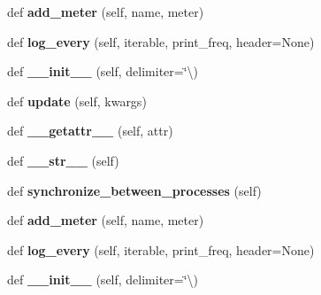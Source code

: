 \begin{DoxyCompactItemize}
\mbox{\label{classutils_1_1MetricLogger_a7ca17a885a17883f5301ee3bbe1682f6}} 
def {\bfseries add\+\_\+meter} (self, name, meter)
\item 
\mbox{\label{classutils_1_1MetricLogger_a52307f8e0e7d7036cec2034cb19dcbea}} 
def {\bfseries log\+\_\+every} (self, iterable, print\+\_\+freq, header=None)
\item 
\mbox{\label{classutils_1_1MetricLogger_a59c07b109de104bdab791643a7b3619b}} 
def {\bfseries \+\_\+\+\_\+init\+\_\+\+\_\+} (self, delimiter=\char`\"{}\textbackslash{})
\item 
\mbox{\label{classutils_1_1MetricLogger_a7ff577d15013ac9ad358428fd7e6ac77}} 
def {\bfseries update} (self, kwargs)
\item 
\mbox{\label{classutils_1_1MetricLogger_ac83dc82a4b7c2f4078fdbbc7d75ed18b}} 
def {\bfseries \+\_\+\+\_\+getattr\+\_\+\+\_\+} (self, attr)
\item 
\mbox{\label{classutils_1_1MetricLogger_a7dbbefdb1b1e47db288d2c3384af11fe}} 
def {\bfseries \+\_\+\+\_\+str\+\_\+\+\_\+} (self)
\item 
\mbox{\label{classutils_1_1MetricLogger_aceb85ddf415836087996c28d6ed54456}} 
def {\bfseries synchronize\+\_\+between\+\_\+processes} (self)
\item 
\mbox{\label{classutils_1_1MetricLogger_a7ca17a885a17883f5301ee3bbe1682f6}} 
def {\bfseries add\+\_\+meter} (self, name, meter)
\item 
\mbox{\label{classutils_1_1MetricLogger_a52307f8e0e7d7036cec2034cb19dcbea}} 
def {\bfseries log\+\_\+every} (self, iterable, print\+\_\+freq, header=None)
\item 
\mbox{\label{classutils_1_1MetricLogger_a59c07b109de104bdab791643a7b3619b}} 
def {\bfseries \+\_\+\+\_\+init\+\_\+\+\_\+} (self, delimiter=\char`\"{}\textbackslash{})
\item 

\end{DoxyCompactItemize}
